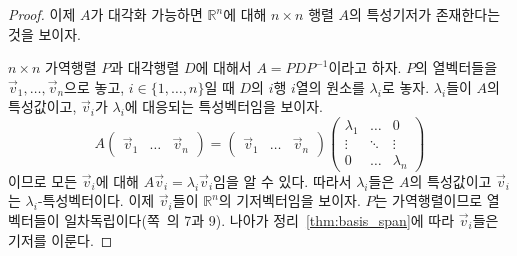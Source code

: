 \documentclass[../engineering_mathematics_lecture_note.tex]{subfiles}
\begin{document}
\begin{proof}
    이제 $A$가 대각화 가능하면 $\mathbb R^n$에 대해 $n \times n$ 행렬 $A$의 특성기저가 존재한다는 것을 보이자.

    $n \times n$ 가역행렬 $P$과 대각행렬 $D$에 대해서 $A = PDP^{-1}$이라고 하자.
    $P$의 열벡터들을 $\vec v_1, \dots, \vec v_n$으로 놓고, $i \in \{1, \dots, n\}$일 때 $D$의 $i$행 $i$열의 원소를 $\lambda_i$로 놓자.
    $\lambda_i$들이 $A$의 특성값이고, $\vec v_i$가 $\lambda_i$에 대응되는 특성벡터임을 보이자.
    \begin{equation*}
        A
        \begin{pmatrix}
            \vec v_1 & \dots & \vec v_n
        \end{pmatrix}
        =
        \begin{pmatrix}
            \vec v_1 & \dots & \vec v_n
        \end{pmatrix}
        \begin{pmatrix}
            \lambda_1 & \dots & 0\\
            \vdots & \ddots & \vdots\\
            0 & \dots & \lambda_n
        \end{pmatrix}
    \end{equation*}
    이므로 모든 $\vec v_i$에 대해 $A \vec v_i = \lambda_i \vec v_i$임을 알 수 있다.
    따라서 $\lambda_i$들은 $A$의 특성값이고 $\vec v_i$는 $\lambda_i$-특성벡터이다.
    이제 $\vec v_i$들이 $\mathbb R^n$의 기저벡터임을 보이자.
    $P$는 가역행렬이므로 열벡터들이 일차독립이다(쪽~\pageref{page:equiv_remark_update}의 7과 9).
    나아가 정리~\ref{thm:basis_span}에 따라 $\vec v_i$들은 기저를 이룬다.
\end{proof}
\end{document}
